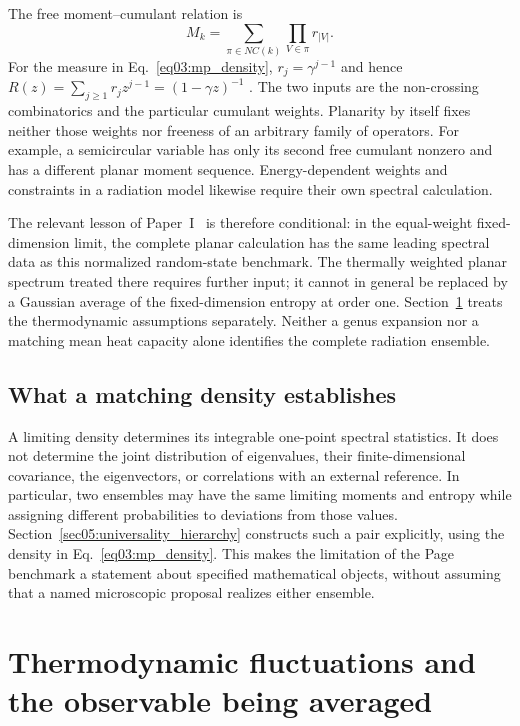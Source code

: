 \documentclass[11pt,letterpaper]{article}
\theoremstyle{plain}
\theoremstyle{definition}
\theoremstyle{remark}
\begin{document}
The free moment--cumulant relation is
\begin{equation}
\label{eq03:free_cumulants}
 M_k=\sum_{\pi\in NC(k)}\prod_{V\in\pi}r_{|V|}.
\end{equation}
For the measure in Eq.~\eqref{eq03:mp_density}, $r_j=\gamma^{j-1}$
and hence $R(z)=\sum_{j\geq1}r_jz^{j-1}=(1-\gamma z)^{-1}$
\cite{speicher1994,nicaspeicher2006}.  The two inputs are the
non-crossing combinatorics and the particular cumulant weights.
Planarity by itself fixes neither those weights nor freeness of an
arbitrary family of operators.  For example, a semicircular variable
has only its second free cumulant nonzero and has a different planar
moment sequence.  Energy-dependent weights and constraints in a
radiation model likewise require their own spectral calculation.

The relevant lesson of Paper~I~\cite{wuebben2026a} is therefore
conditional: in the equal-weight fixed-dimension limit, the complete
planar calculation has the same leading spectral data as this normalized
random-state benchmark.  The thermally weighted planar spectrum treated
there requires further input; it cannot in general be replaced by a
Gaussian average of the fixed-dimension entropy at order one.
Section~\ref{sec04:paper_two_ensemble} treats the thermodynamic assumptions
separately.  Neither a genus expansion nor a matching mean heat capacity
alone identifies the complete radiation ensemble.

\subsection{What a matching density establishes}
\label{subsec03:consequence}

A limiting density determines its integrable one-point spectral
statistics.  It does not determine the joint distribution of eigenvalues,
their finite-dimensional covariance, the eigenvectors, or correlations
with an external reference.  In particular, two ensembles may have the
same limiting moments and entropy while assigning different probabilities
to deviations from those values.  Section~\ref{sec05:universality_hierarchy}
constructs such a pair explicitly, using the density in
Eq.~\eqref{eq03:mp_density}.  This makes the limitation of the Page
benchmark a statement about specified mathematical objects, without
assuming that a named microscopic proposal realizes either ensemble.

\section{Thermodynamic fluctuations and the observable being averaged}
\label{sec04:paper_two_ensemble}
\end{document}

